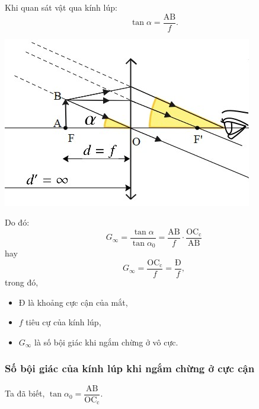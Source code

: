 Khi quan sát vật qua kính lúp: $$\tan \alpha=\dfrac{\text{AB}}{f}.$$
\begin{center}
	\includegraphics[scale=0.8]{../figs/VN11-PH-41-L-029-2-h48.jpg}
\end{center}

Do đó: $$G_\infty=\dfrac{\tan \alpha}{\tan \alpha_0}=\dfrac{\text{AB}}{f}\cdot \dfrac{\text{OC}_\text{c}}{\text{AB}}$$
hay 
\begin{equation}
G_\infty=\dfrac{\text{OC}_\text{c}}{f}=\dfrac{\text{Đ}}{f},
\end{equation}
trong đó,
\begin{itemize}
	\item $\text{Đ}$ là khoảng cực cận của mắt,
	\item $f$ tiêu cự của kính lúp,
	\item $G_\infty$ là số bội giác khi ngắm chừng ở vô cực. 
	
\end{itemize}


\subsubsection{Số bội giác của kính lúp khi ngắm chừng ở cực cận}
Ta đã biết,  $\tan \alpha_0=\dfrac{\text{AB}}{\text{OC}_\text{c}}$.

